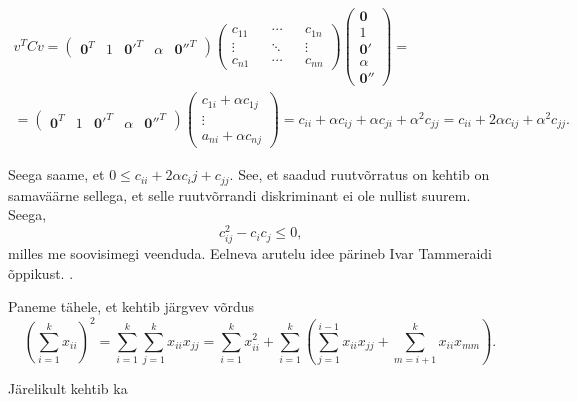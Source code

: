 \documentclass[a4paper,12pt]{article}
\numberwithin{equation}{section}
\theoremstyle{definition}
\begin{document}
\begin{equation*}
\begin{gathered}
v^{T}Cv =
\begin{pmatrix}
\mathbf{0}^T & 1 & \mathbf{0'}^T & \alpha & \mathbf{0''}^T
\end{pmatrix}
\begin{pmatrix}
c_{11} && \cdots && c_{1n} \\
\vdots && \ddots && \vdots \\
c_{n1} && \cdots && c_{nn}  
\end{pmatrix}
\begin{pmatrix}
\mathbf{0} \\ 
1 \\
\mathbf{0'} \\
\alpha \\
\mathbf{0''} 
\end{pmatrix}  =\\
= \begin{pmatrix}
\mathbf{0}^T & 1 & \mathbf{0'}^T & \alpha & \mathbf{0''}^T
\end{pmatrix}
\begin{pmatrix}
c_{1i} + \alpha c_{1j} \\
\vdots \\
a_{ni} + \alpha c_{nj} 
\end{pmatrix}
= c_{ii} + \alpha c_{ij} + \alpha c_{ji} + \alpha^2 c_{jj} = c_{ii} + 2 \alpha c_{ij} + \alpha^2 c_{jj} \text{.}
\end{gathered}
\end{equation*}


Seega saame, et $ 0 \leq c_{ii} + 2\alpha{c_ij} + c_{jj}$. See, et saadud ruutvõrratus on kehtib on samaväärne sellega, et selle ruutvõrrandi diskriminant ei ole nullist suurem. Seega,   
\begin{equation*}
c_{ij}^2 - c_{i}c_{j} \leq 0 \text{,} 
\end{equation*}
milles me soovisimegi veenduda. Eelneva arutelu idee pärineb Ivar Tammeraidi õppikust. \cite{Tammeraid1999}.  


Paneme tähele, et kehtib järgvev võrdus 
\begin{equation*}
\left( \sum \limits_{i=1}^k x_{ii} \right)^2 = \sum \limits_{i=1}^k \sum \limits_{j=1}^k x_{ii} x_{jj} =   \sum \limits_{i=1}^k x_{ii}^2 + \sum \limits_{i=1}^k  \left( \sum \limits_{j=1}^{i-1} x_{ii} x_{jj} + \sum \limits_{m=i+1}^k {x_{ii}}{x_{mm}} \right) \text{.}
\end{equation*}

Järelikult kehtib ka 
\end{document}
